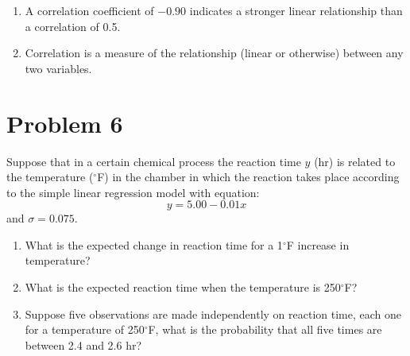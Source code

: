 \documentclass[11pt,twoside]{article}
\newcommand{\pts}[1]{\marginpar{ \small\hspace{0pt} \textit{[#1]} } }
\numberwithin{equation}{section}
\newcommand{\?}{\stackrel{?}{=}}
\begin{document}
\begin{enumerate}[\bf (a)]
\item  A correlation coefficient of $-0.90$ indicates a stronger linear relationship than a correlation of 0.5.
  \vspace{15ex}
  
\item  Correlation is a measure of the relationship (linear or otherwise) between any two variables.
 
\vspace{15ex}
%
\end{enumerate}


\eject
\section*{Problem 6 }
Suppose that in a certain chemical process the reaction time $y$ (hr) is related to the temperature ($^\circ$F) in the chamber in which
the reaction takes place according to the simple linear regression model with equation:
\begin{equation*}
  y = 5.00 - 0.01x
\end{equation*}
and $\sigma = 0.075$.
\begin{enumerate}[\bf (a)]
\item What is the expected change in reaction time for a 1$^\circ$F increase in temperature? \pts{1}
  \vspace{15ex}
  
\item What is the expected reaction time when the temperature is 250$^\circ$F? \pts{2}
\vspace{25ex}

\item Suppose five observations are made independently \pts{4}
  on reaction time, each one for a temperature of 250$^\circ$F, what is the probability that all five times are between 2.4 and 2.6 hr?
 
\end{enumerate}

\eject
\end{document}
